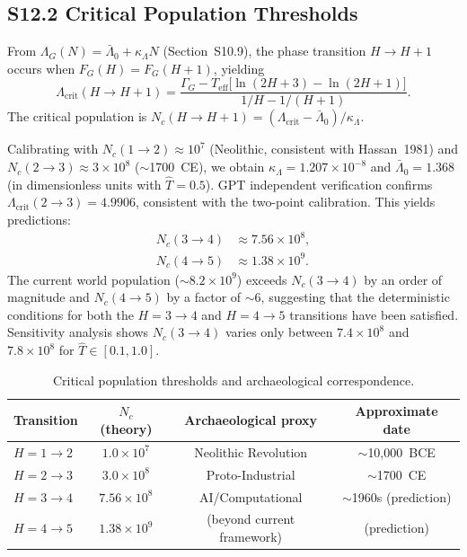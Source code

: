 \documentclass[11pt]{article}
\begin{document}
\subsection*{S12.2 Critical Population Thresholds}

From $\Lambda_G(N) = \bar{\Lambda}_0 + \kappa_\Lambda N$ (Section~S10.9), the phase transition $H \to H{+}1$ occurs when $F_G(H) = F_G(H{+}1)$, yielding
\begin{equation}
  \Lambda_{\mathrm{crit}}(H \to H{+}1) = \frac{\Gamma_G - T_{\mathrm{eff}} \bigl[\ln(2H{+}3) - \ln(2H{+}1)\bigr]}{1/H - 1/(H{+}1)}.
  \label{eq:Lambda_crit}
\end{equation}
The critical population is $N_c(H \to H{+}1) = (\Lambda_{\mathrm{crit}} - \bar{\Lambda}_0) / \kappa_\Lambda$.

Calibrating with $N_c(1 \to 2) \approx 10^7$ (Neolithic, consistent with Hassan~1981) and $N_c(2 \to 3) \approx 3 \times 10^8$ ($\sim$1700~CE), we obtain $\kappa_\Lambda = 1.207 \times 10^{-8}$ and $\bar{\Lambda}_0 = 1.368$ (in dimensionless units with $\hat{T} = 0.5$).  GPT independent verification confirms $\Lambda_{\mathrm{crit}}(2 \to 3) = 4.9906$, consistent with the two-point calibration.  This yields predictions:
\begin{align}
  N_c(3 \to 4) &\approx 7.56 \times 10^8, \label{eq:Nc34} \\
  N_c(4 \to 5) &\approx 1.38 \times 10^9. \label{eq:Nc45}
\end{align}
The current world population ($\sim 8.2 \times 10^9$) exceeds $N_c(3 \to 4)$ by an order of magnitude and $N_c(4 \to 5)$ by a factor of $\sim$6, suggesting that the deterministic conditions for both the $H = 3 \to 4$ and $H = 4 \to 5$ transitions have been satisfied.  Sensitivity analysis shows $N_c(3 \to 4)$ varies only between $7.4 \times 10^8$ and $7.8 \times 10^8$ for $\hat{T} \in [0.1, 1.0]$.

\begin{table}[h]
\centering
\caption{Critical population thresholds and archaeological correspondence.}
\label{tab:Ncritical}
\begin{tabular}{lccc}
\hline
Transition & $N_c$ (theory) & Archaeological proxy & Approximate date \\
\hline
$H = 1 \to 2$ & $1.0 \times 10^7$ & Neolithic Revolution & $\sim$10,000~BCE \\
$H = 2 \to 3$ & $3.0 \times 10^8$ & Proto-Industrial & $\sim$1700~CE \\
$H = 3 \to 4$ & $7.56 \times 10^8$ & AI/Computational & $\sim$1960s (prediction) \\
$H = 4 \to 5$ & $1.38 \times 10^9$ & (beyond current framework) & (prediction) \\  %
\hline
\end{tabular}
\end{table}
\end{document}
